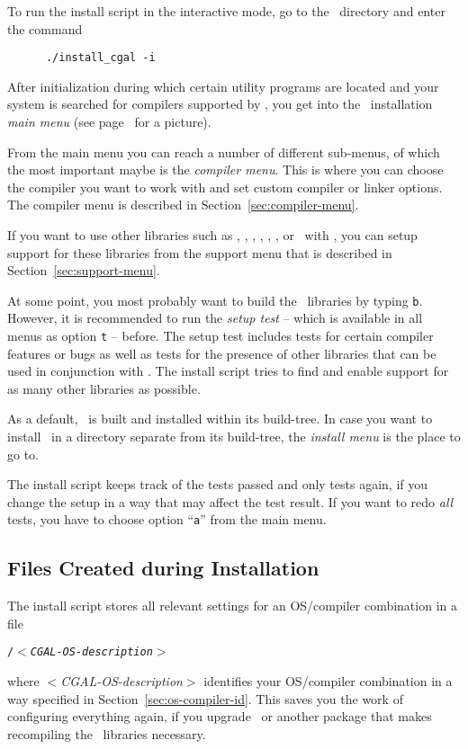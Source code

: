 To run the install script in the interactive mode, go to the \cgaldir\
directory and enter the command
\begin{verbatim}
      ./install_cgal -i
\end{verbatim}

After initialization during which certain utility programs are located
and your system is searched for compilers supported by \cgal, you get
into the \cgal\ installation \textit{main menu} (see
page~\pageref{pic:main-menu} for a picture).

From the main menu you can reach a number of different sub-menus, of
which the most important maybe is the \textit{compiler menu}. This is
where you can choose the compiler you want to work with and set custom
compiler or linker options. The compiler menu is described in
Section~\ref{sec:compiler-menu}.

If you want to use other libraries such as \boost, \taucs, \gmp,
\mpfr, \core, \leda, or \qt\ with \cgal, you can setup support for
these libraries from the support menu that is described in
Section~\ref{sec:support-menu}.

At some point, you most probably want to build the \cgal\ libraries by
typing \texttt{b}. However, it is recommended to run the \textit{setup
  test} -- which is available in all menus as option \texttt{t} --
before. The setup test includes tests for certain compiler features or
bugs as well as tests for the presence of other libraries that can be
used in conjunction with \cgal. The install script tries to find and
enable support for as many other libraries as possible.

As a default, \cgal\ is built and installed within its build-tree. In
case you want to install \cgal\ in a directory separate from its
build-tree, the \textit{install menu} is the place to go to.

The install script keeps track of the tests passed and only tests
again, if you change the setup in a way that may affect the test
result. If you want to redo \textit{all} tests, you have to choose
option ``\texttt{a}'' from the main menu.

\subsection{Files Created during Installation\label{sec:filescreated}}

The install script stores all relevant settings for an OS/compiler
combination in a file
\begin{center}
  \texttt{\cgalinstconfdir/$<$\textit{CGAL-OS-description}$>$}
\end{center}
where $<$\textit{CGAL-OS-description}$>$ identifies your OS/compiler
combination in a way specified in Section~\ref{sec:os-compiler-id}.
This saves you the work of configuring everything again, if you
upgrade  \cgal\ or
another package that makes recompiling the \cgal\ libraries necessary.


